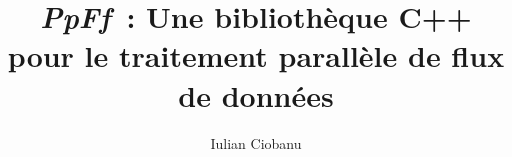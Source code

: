 \documentclass[12pt]{latex/memoireuqam1.3}          %
\begin{document}

\title{\emph{P\lowercase{p}F\lowercase{f}}~: Une bibliothèque C++ pour le traitement parall\`ele de flux de donn\'ees}

\author{Iulian Ciobanu}
\uqammemoire
{}

\thispagestyle{empty}
\maketitle


\renewcommand \bibname{BIBLIOGRAPHIE}

\renewcommand \listfigurename{LISTE DES FIGURES}
\renewcommand \listtablename{LISTE DES TABLEAUX}
\renewcommand \lstlistlistingname{LISTE DES LISTINGS}
\renewcommand \appendixname{ANNEXE}
\renewcommand \figurename{Figure}
\renewcommand \tablename{Tableau}

\addtocounter{page}{1}





\setcounter{tocdepth}{2}

\tableofcontents
\listoffigures
\listoftables

\lstlistoflistings
{}





\end{document}

